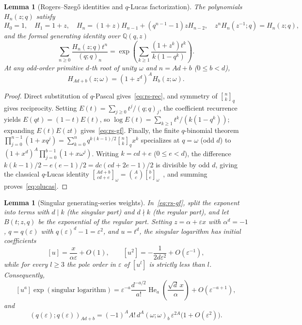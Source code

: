 \documentclass[11pt,reqno]{amsart}
\numberwithin{equation}{section}
\newtheorem{lemma}[theorem]{Lemma}
\theoremstyle{definition}
\theoremstyle{remark}
\newcommand{\Q}{\mathbb{Q}}
\newcommand{\He}{\operatorname{He}}
\newcommand{\eps}{\varepsilon}
\newcommand{\poch}[3]{(#1;#2)_{#3}}
\newcommand{\qbin}[2]{\genfrac{[}{]}{0pt}{}{#1}{#2}_q}
\newcommand{\qbinw}[2]{\genfrac{[}{]}{0pt}{}{#1}{#2}_\omega}
\begin{document}
\begin{lemma}[Rogers--Szeg\H{o} identities and $q$-Lucas factorization]
\label{lem:rs-basic}
The polynomials $H_n(z;q)$ satisfy
\begin{equation}
\label{eq:rs-rec}
H_0=1,\quad H_1=1+z,\quad
H_n=(1+z)H_{n-1}+(q^{n-1}-1)zH_{n-2},\quad
z^n H_n(z^{-1};q)=H_n(z;q),
\end{equation}
and the formal generating identity over $\Q(q,z)$
\begin{equation}
\label{eq:rs-gf}
\sum_{n\ge 0}\frac{H_n(z;q)t^n}{\poch{q}{q}{n}}
= \exp\!\left(\sum_{k\ge 1}\frac{(1+z^k)t^k}{k(1-q^k)}\right).
\end{equation}
At any odd-order primitive $d$-th root of unity $\omega$ and $n=Ad+b$ ($0\le b<d$),
\begin{equation}
\label{eq:qlucas}
H_{Ad+b}(z;\omega) = (1+z^d)^A H_b(z;\omega).
\end{equation}
\end{lemma}

\begin{proof}
Direct substitution of $q$-Pascal gives~\eqref{eq:rs-rec}, and symmetry of $\qbin{n}{k}$ gives reciprocity. Setting $E(t)=\sum_{j\ge 0} t^j/\poch{q}{q}{j}$, the coefficient recurrence yields $E(qt)=(1-t)E(t)$, so $\log E(t)=\sum_{k\ge 1}t^k/(k(1-q^k))$; expanding $E(t)E(zt)$ gives~\eqref{eq:rs-gf}. Finally, the finite $q$-binomial theorem $\prod_{j=0}^{n-1}(1+xq^j)=\sum_{k=0}^n q^{k(k-1)/2}\qbin{n}{k}x^k$ specializes at $q=\omega$ (odd $d$) to $(1+x^d)^A\prod_{j=0}^{b-1}(1+x\omega^j)$. Writing $k=cd+e$ ($0\le e<d$), the difference $k(k-1)/2-e(e-1)/2 = dc(cd+2e-1)/2$ is divisible by odd $d$, giving the classical $q$-Lucas identity $\qbinw{Ad+b}{cd+e}=\binom{A}{c}\qbinw{b}{e}$~\cite{LS87,Sag92}, and summing proves~\eqref{eq:qlucas}.
\end{proof}

\begin{lemma}[Singular generating-series weights]
\label{lem:singular}
In~\eqref{eq:rs-gf}, split the exponent into terms with $d\mid k$ (the singular part) and $d\nmid k$ (the regular part), and let $B(t;z,q)$ be the exponential of the regular part. Setting $z=\alpha+\eps x$ with $\alpha^d=-1$, $q=q(\eps)$ with $q(\eps)^d-1=\eps^2$, and $u=t^d$, the singular logarithm has initial coefficients
\begin{equation}
\label{eq:sing-log}
[u] = \frac{x}{\alpha\eps} + O(1),\qquad
[u^2] = -\frac{1}{2d\eps^2} + O(\eps^{-1}),
\end{equation}
while for every $l\ge 3$ the pole order in $\eps$ of $[u^l]$ is strictly less than $l$. Consequently,
\begin{equation}
\label{eq:sing-exp}
[u^a]\exp(\text{singular logarithm}) = \eps^{-a}\frac{d^{-a/2}}{a!}\He_a\!\left(\frac{\sqrt{d}\,x}{\alpha}\right) + O(\eps^{-a+1}),
\end{equation}
and
\begin{equation}
\label{eq:poch-exp}
\poch{q(\eps)}{q(\eps)}{Ad+b} = (-1)^A A!\, d^A \poch{\omega}{\omega}{b}\, \eps^{2A}\bigl(1+O(\eps^2)\bigr).
\end{equation}
\end{lemma}
\end{document}
